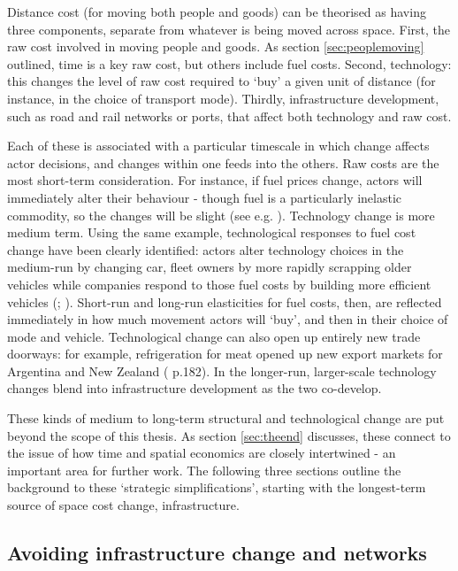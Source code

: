 {Distance cost (for moving both people and goods) can be theorised as having three components, separate from whatever is being moved across space. First, the raw cost involved in moving people and goods. As section \ref{sec:peoplemoving} outlined, time is a key raw cost, but others include fuel costs. Second, technology: this changes the level of raw cost required to `buy' a given unit of distance (for instance, in the choice of transport mode). Thirdly, infrastructure development, such as road and rail networks or ports, that affect both technology and raw cost.

Each of these is associated with a particular timescale in which change affects actor decisions, and changes within one feeds into the others. Raw costs are the most short-term consideration. For instance, if fuel prices change, actors will immediately alter their behaviour - though fuel is a particularly inelastic commodity, so the changes will be slight (see e.g. \citealt{goodwin_elasticities_2004}). Technology change is more medium term. Using the same example, technological responses to fuel cost change have been clearly identified: actors alter technology choices in the medium-run by changing car, fleet owners by more rapidly scrapping older vehicles while companies respond to those fuel costs by building more efficient vehicles (\citealt{brons_meta-analysis_2008}; \citealt{li_how_2008}). Short-run and long-run elasticities for fuel costs, then, are reflected immediately in how much movement actors will `buy', and then in their choice of mode and vehicle. Technological change can also open up entirely new trade doorways: for example, refrigeration for meat opened up new export markets for Argentina and New Zealand (\citealt{chapman_people_1979} p.182). In the longer-run, larger-scale technology changes blend into infrastructure development as the two co-develop. 

These kinds of medium to long-term structural and technological change are put beyond the scope of this thesis. As section \ref{sec:theend} discusses, these connect to the issue of how time and spatial economics are closely intertwined - an important area for further work. The following three sections outline the background to these `strategic simplifications', starting with the longest-term source of space cost change, infrastructure.

\subsection{Avoiding infrastructure change and networks \label{sec:routedev}}

}
